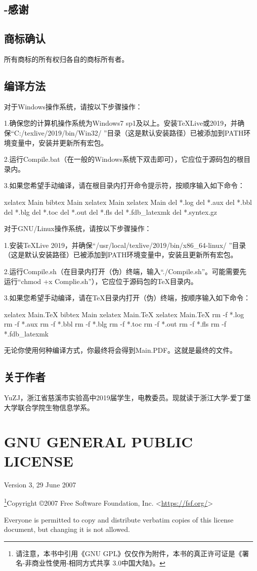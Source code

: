 \section{-感谢}
\section{商标确认}
所有商标的所有权归各自的商标所有者。
\section{编译方法}
对于Windows操作系统，请按以下步骤操作：\par
1.确保您的计算机操作系统为Windows7 sp1及以上。安装TeXLive或2019，并确保“C:/texlive/2019/bin/Win32/ ”目录（这是默认安装路径）已被添加到PATH环境变量中，安装并更新所有宏包。\par
2.运行Compile.bat（在一般的Windows系统下双击即可），它应位于源码包的根目录内。\par
3.如果您希望手动编译，请在根目录内打开命令提示符，按顺序输入如下命令：
\begin{verbatim*}
xelatex Main
bibtex Main
xelatex Main
xelatex Main
del *.log
del *.aux
del *.bbl
del *.blg
del *.toc
del *.out
del *.fls
del *.fdb_latexmk
del *.syntex.gz
\end{verbatim*}
对于GNU/Linux操作系统，请按以下步骤操作：\par
1.安装TeXLive 2019，并确保“/usr/local/texlive/2019/bin/x86\_64-linux/ ”目录（这是默认安装路径）已被添加到PATH环境变量中，安装且更新所有宏包。\par
2.运行Compile.sh（在目录内打开（伪）终端，输入“./Compile.sh”。可能需要先运行“chmod +x Complie.sh”），它应位于源码包的TeX目录内。\par
3.如果您希望手动编译，请在TeX目录内打开（伪）终端，按顺序输入如下命令：
\begin{verbatim*}
xelatex Main.TeX
bibtex Main
xelatex Main.TeX
xelatex Main.TeX
rm -f *.log
rm -f *.aux
rm -f *.bbl
rm -f *.blg
rm -f *.toc
rm -f *.out
rm -f *.fls
rm -f *.fdb_latexmk
\end{verbatim*}
无论你使用何种编译方式，你最终将会得到Main.PDF。这就是最终的文件。
\section{关于作者}
YuZJ，浙江省慈溪市实验高中2019届学生，电教委员。现就读于浙江大学-爱丁堡大学联合学院生物信息学系。
\chapter{GNU GENERAL PUBLIC LICENSE}
\begin{center} Version 3, 29 June 2007 \end{center}
\footnote{请注意，本书中引用《GNU GPL》仅仅作为附件，本书的真正许可证是《署名-非商业性使用-相同方式共享 3.0中国大陆》。}\cite{gpl}Copyright \copyright 2007 Free Software Foundation, Inc. <\url{https://fsf.org/}>\par
Everyone is permitted to copy and distribute verbatim copies of this license document, but changing it is not allowed.\par
